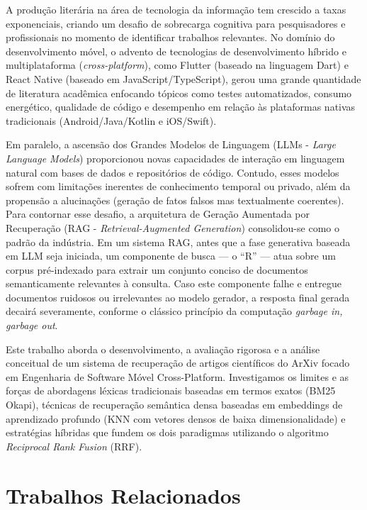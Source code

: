 \documentclass[12pt]{article}
\begin{document}
A produção literária na área de tecnologia da informação tem crescido a taxas exponenciais, criando um desafio de sobrecarga cognitiva para pesquisadores e profissionais no momento de identificar trabalhos relevantes. No domínio do desenvolvimento móvel, o advento de tecnologias de desenvolvimento híbrido e multiplataforma (\textit{cross-platform}), como Flutter (baseado na linguagem Dart) e React Native (baseado em JavaScript/TypeScript), gerou uma grande quantidade de literatura acadêmica enfocando tópicos como testes automatizados, consumo energético, qualidade de código e desempenho em relação às plataformas nativas tradicionais (Android/Java/Kotlin e iOS/Swift).

Em paralelo, a ascensão dos Grandes Modelos de Linguagem (LLMs - \textit{Large Language Models}) proporcionou novas capacidades de interação em linguagem natural com bases de dados e repositórios de código. Contudo, esses modelos sofrem com limitações inerentes de conhecimento temporal ou privado, além da propensão a alucinações (geração de fatos falsos mas textualmente coerentes). Para contornar esse desafio, a arquitetura de Geração Aumentada por Recuperação (RAG - \textit{Retrieval-Augmented Generation}) consolidou-se como o padrão da indústria. Em um sistema RAG, antes que a fase generativa baseada em LLM seja iniciada, um componente de busca --- o ``R'' --- atua sobre um corpus pré-indexado para extrair um conjunto conciso de documentos semanticamente relevantes à consulta. Caso este componente falhe e entregue documentos ruidosos ou irrelevantes ao modelo gerador, a resposta final gerada decairá severamente, conforme o clássico princípio da computação \textit{garbage in, garbage out}.

Este trabalho aborda o desenvolvimento, a avaliação rigorosa e a análise conceitual de um sistema de recuperação de artigos científicos do ArXiv focado em Engenharia de Software Móvel Cross-Platform. Investigamos os limites e as forças de abordagens léxicas tradicionais baseadas em termos exatos (BM25 Okapi), técnicas de recuperação semântica densa baseadas em embeddings de aprendizado profundo (KNN com vetores densos de baixa dimensionalidade) e estratégias híbridas que fundem os dois paradigmas utilizando o algoritmo \textit{Reciprocal Rank Fusion} (RRF). 

\section{Trabalhos Relacionados}
\end{document}
